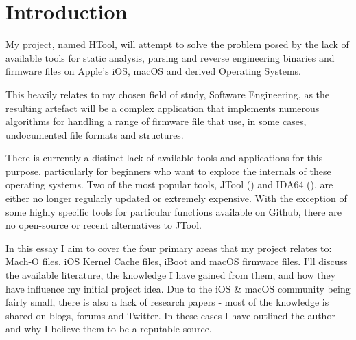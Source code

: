 \section{Introduction}


My project, named HTool, will attempt to solve the problem posed by the lack of available tools for static analysis, parsing and reverse engineering binaries and firmware files on Apple's iOS, macOS and derived Operating Systems.

This heavily relates to my chosen field of study, Software Engineering, as the resulting artefact will be a complex application that implements numerous algorithms for handling a range of firmware file that use, in some cases, undocumented file formats and structures.

There is currently a distinct lack of available tools and applications for this purpose, particularly for beginners who want to explore the internals of these operating systems. Two of the most popular tools, JTool (\cite{levin-jtool}) and IDA64 (\cite{hexrays-ida64-pro}), are either no longer regularly updated or extremely expensive. With the exception of some highly specific tools for particular functions available on Github, there are no open-source or recent alternatives to JTool. 

In this essay I aim to cover the four primary areas that my project relates to: Mach-O files, iOS Kernel Cache files, iBoot and macOS firmware files. I'll discuss the available literature, the knowledge I have gained from them, and how they have influence my initial project idea. Due to the iOS \& macOS community being fairly small, there is also a lack of research papers - most of the knowledge is shared on blogs, forums and Twitter. In these cases I have outlined the author and why I believe them to be a reputable source. 